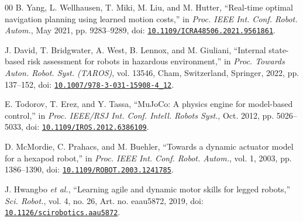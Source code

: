 \documentclass{ieeeaccess}
\begin{document}
\begin{thebibliography}{00}
B. Yang, L. Wellhausen, T. Miki, M. Liu, and M. Hutter, \textquotedblleft{}Real-time optimal navigation planning using learned motion costs,\textquotedblright{} in \emph{Proc. IEEE Int. Conf. Robot. Autom.}, May 2021, pp. 9283--9289, doi: \href{https://doi.org/10.1109/ICRA48506.2021.9561861}{\nolinkurl{10.1109/ICRA48506.2021.9561861}}.

J. David, T. Bridgwater, A. West, B. Lennox, and M. Giuliani, \textquotedblleft{}Internal state-based risk assessment for robots in hazardous environment,\textquotedblright{} in \emph{Proc. Towards Auton. Robot. Syst. (TAROS)}, vol. 13546, Cham, Switzerland, Springer, 2022, pp. 137--152, doi: \href{https://doi.org/10.1007/978-3-031-15908-4_12}{\nolinkurl{10.1007/978-3-031-15908-4_12}}.

E. Todorov, T. Erez, and Y. Tassa, \textquotedblleft{}MuJoCo: A physics engine for model-based control,\textquotedblright{} in \emph{Proc. IEEE/RSJ Int. Conf. Intell. Robots Syst.}, Oct. 2012, pp. 5026--5033, doi: \href{https://doi.org/10.1109/IROS.2012.6386109}{\nolinkurl{10.1109/IROS.2012.6386109}}.

D. McMordie, C. Prahacs, and M. Buehler, \textquotedblleft{}Towards a dynamic actuator model for a hexapod robot,\textquotedblright{} in \emph{Proc. IEEE Int. Conf. Robot. Autom.}, vol. 1, 2003, pp. 1386--1390, doi: \href{https://doi.org/10.1109/ROBOT.2003.1241785}{\nolinkurl{10.1109/ROBOT.2003.1241785}}.

J. Hwangbo \emph{et al.}, \textquotedblleft{}Learning agile and dynamic motor skills for legged robots,\textquotedblright{} \emph{Sci. Robot.}, vol. 4, no. 26, Art. no. eaau5872, 2019, doi: \href{https://doi.org/10.1126/scirobotics.aau5872}{\nolinkurl{10.1126/scirobotics.aau5872}}.\EOD
\end{thebibliography}
\end{document}
